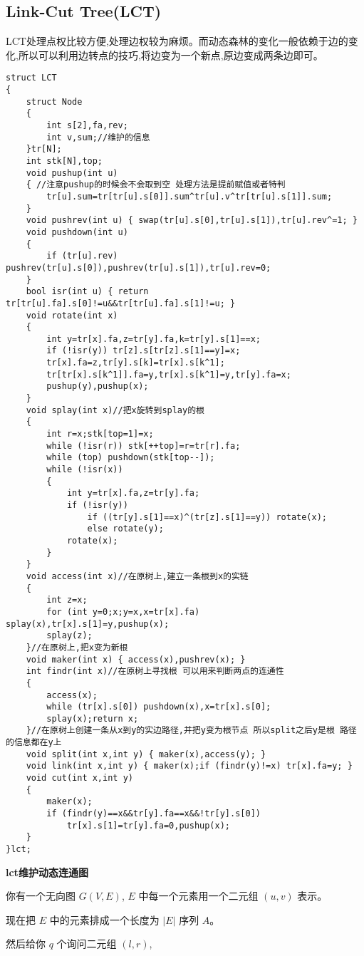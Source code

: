 \documentclass[a4paper]{ctexart}
\begin{document}
\subsection{Link-Cut Tree(LCT)}
LCT处理点权比较方便,处理边权较为麻烦。而动态森林的变化一般依赖于边的变化,所以可以利用边转点的技巧,将边变为一个新点,原边变成两条边即可。
\begin{lstlisting}
struct LCT
{
	struct Node 
    { 
        int s[2],fa,rev;
        int v,sum;//维护的信息 
    }tr[N];
	int stk[N],top;
	void pushup(int u)
    { //注意pushup的时候会不会取到空 处理方法是提前赋值或者特判
        tr[u].sum=tr[tr[u].s[0]].sum^tr[u].v^tr[tr[u].s[1]].sum; 
    }
    void pushrev(int u) { swap(tr[u].s[0],tr[u].s[1]),tr[u].rev^=1; }
	void pushdown(int u)
    {
        if (tr[u].rev) pushrev(tr[u].s[0]),pushrev(tr[u].s[1]),tr[u].rev=0; 
    }
	bool isr(int u) { return tr[tr[u].fa].s[0]!=u&&tr[tr[u].fa].s[1]!=u; }
	void rotate(int x)
	{
		int y=tr[x].fa,z=tr[y].fa,k=tr[y].s[1]==x;
		if (!isr(y)) tr[z].s[tr[z].s[1]==y]=x;
		tr[x].fa=z,tr[y].s[k]=tr[x].s[k^1];
        tr[tr[x].s[k^1]].fa=y,tr[x].s[k^1]=y,tr[y].fa=x;
		pushup(y),pushup(x);
	}
	void splay(int x)//把x旋转到splay的根
	{
		int r=x;stk[top=1]=x;
		while (!isr(r)) stk[++top]=r=tr[r].fa;
		while (top) pushdown(stk[top--]);
		while (!isr(x))
		{
			int y=tr[x].fa,z=tr[y].fa;
			if (!isr(y))
				if ((tr[y].s[1]==x)^(tr[z].s[1]==y)) rotate(x);
                else rotate(y);
			rotate(x);
		}
	}
	void access(int x)//在原树上,建立一条根到x的实链
	{
		int z=x;
		for (int y=0;x;y=x,x=tr[x].fa) splay(x),tr[x].s[1]=y,pushup(x);
		splay(z);
	}//在原树上,把x变为新根
	void maker(int x) { access(x),pushrev(x); }
	int findr(int x)//在原树上寻找根 可以用来判断两点的连通性
	{
		access(x);
		while (tr[x].s[0]) pushdown(x),x=tr[x].s[0];
		splay(x);return x;
    }//在原树上创建一条从x到y的实边路径,并把y变为根节点 所以split之后y是根 路径的信息都在y上
	void split(int x,int y) { maker(x),access(y); }
	void link(int x,int y) { maker(x);if (findr(y)!=x) tr[x].fa=y; }
	void cut(int x,int y)
    { 
        maker(x);
        if (findr(y)==x&&tr[y].fa==x&&!tr[y].s[0])
            tr[x].s[1]=tr[y].fa=0,pushup(x);
    }
}lct;

\end{lstlisting}

\textbf{lct维护动态连通图}

你有一个无向图 $G( V, E )$, $E$ 中每一个元素用一个二元组 $( u, v )$ 表示。

现在把 $E$ 中的元素排成一个长度为 $|E|$ 序列 $A$。

然后给你 $q$ 个询问二元组 $( l, r )$,
\end{document}
